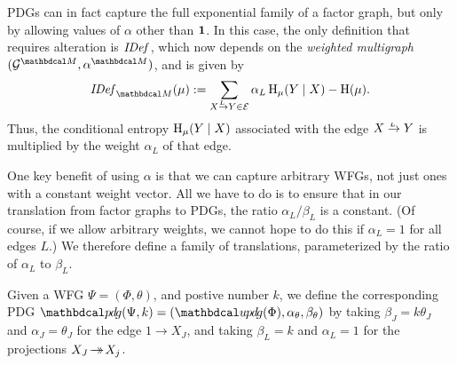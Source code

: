\documentclass{article}
\begin{document}
	PDGs can in fact capture the full exponential family of a factor graph, but only
	by allowing values of $\alpha$ other than ${\bf 1}$. In this case, the
	only definition  
	that requires alteration is $\mathit{IDef}_{}$, which now depends on the \emph{weighted multigraph}
	$(\Gr^{\dg M}, \alpha^{\dg M})$, and is given by
	\begin{equation}
		\IDef{\dg M}(\mu) := \sum_{\ed LXY \in \Ed} \alpha_L \H_\mu(Y\mid X) - \H(\mu). 
		\label{eqn:alt-extra2}
	\end{equation}
	Thus, the conditional entropy $\operatorname{\mathrm{H}}_\mu(Y\mid X)$ associated with the
	edge $\ed LXY$ is multiplied by the weight $\alpha_L$ of that edge.
	
	One key benefit of using $\alpha$ is that we can
	capture arbitrary WFGs, not just ones with a constant weight
	vector.    All we have to do is to ensure that in our translation from
	factor graphs to PDGs, the ratio $\alpha_L/\beta_L$ is a
	constant.  (Of course, if we allow arbitrary weights, we cannot hope
	to do this if $\alpha_L = 1$ for all edges $L$.)  
	We therefore define a family of translations, parameterized by the
	ratio of $\alpha_L$ to $\beta_L$.
	\begin{defn}\label{def:wfg2pdg}
	Given a WFG
	$\Psi=(\Phi, \theta)$,
	and postive number $k$, 
	we define the corresponding PDG $\PDGof{\Psi,k} = (\UPDGof{\Phi},\alpha_{\theta}, \beta_{\theta})$ 
	by taking $\beta_J = k \theta_J$ and $\alpha_J = \theta_J$ for the edge $1  \rightarrow X_J$, and
	taking $\beta_L = k$ and $\alpha_L = 1$ for the projections $X_J \!\rightarrow\mathrel{\mspace{-15mu}}\rightarrow\! X_j$.
	\end{defn}
	
\end{document}
